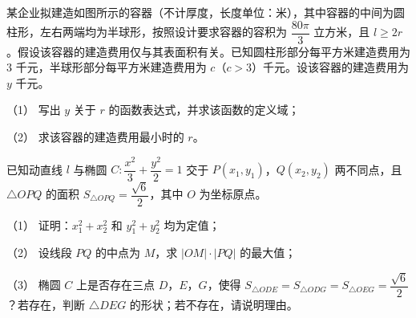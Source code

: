 \begin{question}
某企业拟建造如图所示的容器（不计厚度，长度单位：米），其中容器的中间为圆柱形，左右两端均为半球形，按照设计要求容器的容积为 $\dfrac{80\pi}{3}$ 立方米，且 $l\geqslant2r$。假设该容器的建造费用仅与其表面积有关。已知圆柱形部分每平方米建造费用为 $3$ 千元，半球形部分每平方米建造费用为 $c$（$c>3$）千元。设该容器的建造费用为 $y$ 千元。

（1） 写出 $y$ 关于 $r$ 的函数表达式，并求该函数的定义域；

（2） 求该容器的建造费用最小时的 $r$。
\nopagebreak[4]
\begin{center}\end{center}
\nopagebreak[4]
\end{question}
\begin{question}
已知动直线 $l$ 与椭圆 $C:\dfrac{x^2}{3}+\dfrac{y^2}{2}=1$ 交于 $P(x_1,y_1)$，$Q(x_2,y_2)$ 两不同点，且 $\triangle OPQ$ 的面积 $S_{\triangle OPQ}=\dfrac{\sqrt6}{2}$，其中 $O$ 为坐标原点。

（1） 证明：$x_1^2+x_2^2$ 和 $y_1^2+y_2^2$ 均为定值；

（2） 设线段 $PQ$ 的中点为 $M$，求 $|OM|\cdot|PQ|$ 的最大值；

（3） 椭圆 $C$ 上是否存在三点 $D$，$E$，$G$，使得 $S_{\triangle ODE}=S_{\triangle ODG}=S_{\triangle OEG}=\dfrac{\sqrt6}{2}$？若存在，判断 $\triangle DEG$ 的形状；若不存在，请说明理由。

\end{question}